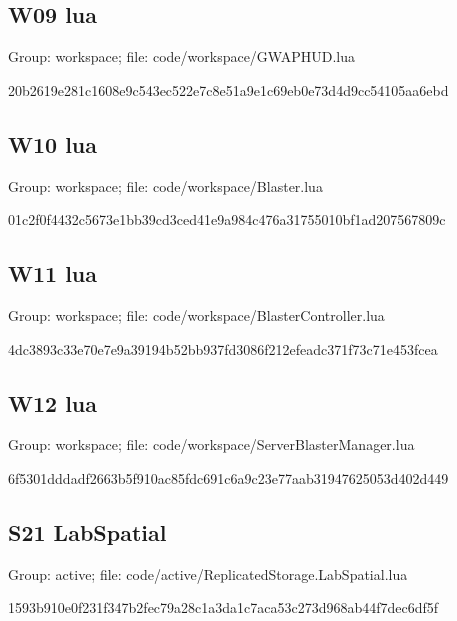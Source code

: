 \subsection{W09 lua}
Group: workspace; file: code/\allowbreak{}workspace/\allowbreak{}GWAPHUD.\allowbreak{}lua

\begin{flushleft}\ttfamily\footnotesize 20b2619e281c1608e9c543ec522e7c8e51a9e1c69eb0e73d4d9cc54105aa6ebd\end{flushleft}
\subsection{W10 lua}
Group: workspace; file: code/\allowbreak{}workspace/\allowbreak{}Blaster.\allowbreak{}lua

\begin{flushleft}\ttfamily\footnotesize 01c2f0f4432c5673e1bb39cd3ced41e9a984c476a31755010bf1ad207567809c\end{flushleft}
\subsection{W11 lua}
Group: workspace; file: code/\allowbreak{}workspace/\allowbreak{}BlasterController.\allowbreak{}lua

\begin{flushleft}\ttfamily\footnotesize 4dc3893c33e70e7e9a39194b52bb937fd3086f212efeadc371f73c71e453fcea\end{flushleft}
\subsection{W12 lua}
Group: workspace; file: code/\allowbreak{}workspace/\allowbreak{}ServerBlasterManager.\allowbreak{}lua

\begin{flushleft}\ttfamily\footnotesize 6f5301dddadf2663b5f910ac85fdc691c6a9c23e77aab31947625053d402d449\end{flushleft}
\subsection{S21 LabSpatial}
Group: active; file: code/\allowbreak{}active/\allowbreak{}ReplicatedStorage.\allowbreak{}LabSpatial.\allowbreak{}lua

\begin{flushleft}\ttfamily\footnotesize 1593b910e0f231f347b2fec79a28c1a3da1c7aca53c273d968ab44f7dec6df5f\end{flushleft}
